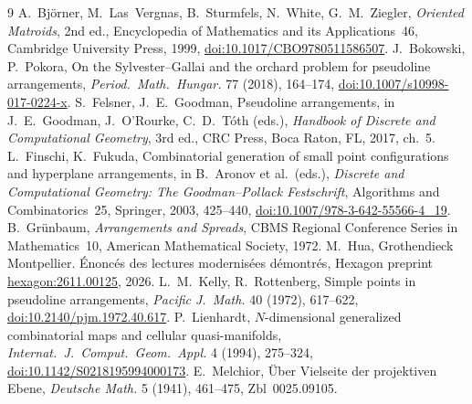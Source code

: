 \documentclass[11pt,a4paper]{amsart}
\theoremstyle{definition}
\theoremstyle{remark}
\begin{document}
\begin{thebibliography}{9}
 A.~Björner, M.~Las~Vergnas, B.~Sturmfels, N.~White, G.~M.~Ziegler, \emph{Oriented Matroids}, 2nd ed., Encyclopedia of Mathematics and its Applications~46, Cambridge University Press, 1999, \href{https://doi.org/10.1017/CBO9780511586507}{doi:10.1017/CBO9780511586507}.
 J.~Bokowski, P.~Pokora, On the Sylvester--Gallai and the orchard problem for pseudoline arrangements, \emph{Period.\ Math.\ Hungar.} 77 (2018), 164--174, \href{https://doi.org/10.1007/s10998-017-0224-x}{doi:10.1007/s10998-017-0224-x}.
 S.~Felsner, J.~E.~Goodman, Pseudoline arrangements, in J.~E.~Goodman, J.~O'Rourke, C.~D.~Tóth (eds.), \emph{Handbook of Discrete and Computational Geometry}, 3rd ed., CRC Press, Boca Raton, FL, 2017, ch.~5.
 L.~Finschi, K.~Fukuda, Combinatorial generation of small point configurations and hyperplane arrangements, in B.~Aronov et al.\ (eds.), \emph{Discrete and Computational Geometry: The Goodman--Pollack Festschrift}, Algorithms and Combinatorics~25, Springer, 2003, 425--440, \href{https://doi.org/10.1007/978-3-642-55566-4_19}{doi:10.1007/978-3-642-55566-4\_19}.
 B.~Grünbaum, \emph{Arrangements and Spreads}, CBMS Regional Conference Series in Mathematics~10, American Mathematical Society, 1972.
 M.~Hua, Grothendieck Montpellier. Énoncés des lectures modernisées démontrés, Hexagon preprint \href{https://hexagonmath.org/2611.00125}{hexagon:2611.00125}, 2026.
 L.~M.~Kelly, R.~Rottenberg, Simple points in pseudoline arrangements, \emph{Pacific J.\ Math.} 40 (1972), 617--622, \href{https://doi.org/10.2140/pjm.1972.40.617}{doi:10.2140/pjm.1972.40.617}.
 P.~Lienhardt, $N$-dimensional generalized combinatorial maps and cellular quasi-manifolds, \emph{Internat.\ J.\ Comput.\ Geom.\ Appl.} 4 (1994), 275--324, \href{https://doi.org/10.1142/S0218195994000173}{doi:10.1142/S0218195994000173}.
 E.~Melchior, Über Vielseite der projektiven Ebene, \emph{Deutsche Math.} 5 (1941), 461--475, Zbl~0025.09105.
\end{thebibliography}
\end{document}
